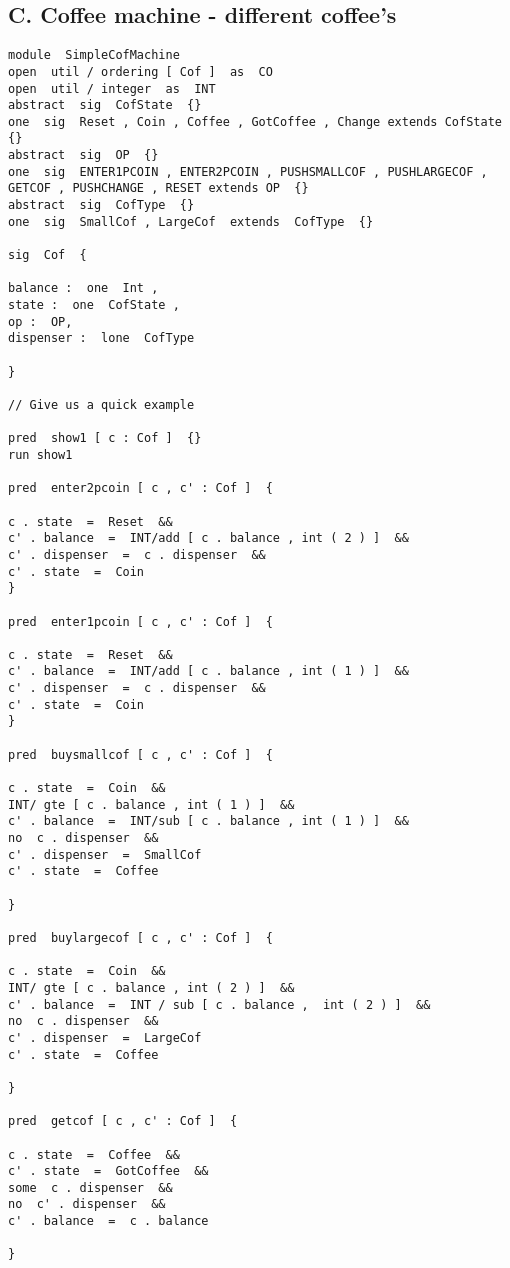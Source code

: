 \documentclass[a4paper,12pt]{extarticle}
\begin{document}
\subsection{C. Coffee machine - different coffee's}
\begin{verbatim}
module  SimpleCofMachine
open  util / ordering [ Cof ]  as  CO
open  util / integer  as  INT
abstract  sig  CofState  {}
one  sig  Reset , Coin , Coffee , GotCoffee , Change extends CofState  {}
abstract  sig  OP  {}
one  sig  ENTER1PCOIN , ENTER2PCOIN , PUSHSMALLCOF , PUSHLARGECOF ,
GETCOF , PUSHCHANGE , RESET extends OP  {}
abstract  sig  CofType  {}
one  sig  SmallCof , LargeCof  extends  CofType  {}

sig  Cof  {

balance :  one  Int ,
state :  one  CofState ,
op :  OP,
dispenser :  lone  CofType

}

// Give us a quick example

pred  show1 [ c : Cof ]  {}
run show1

pred  enter2pcoin [ c , c' : Cof ]  {

c . state  =  Reset  &&
c' . balance  =  INT/add [ c . balance , int ( 2 ) ]  &&
c' . dispenser  =  c . dispenser  &&
c' . state  =  Coin
}

pred  enter1pcoin [ c , c' : Cof ]  {

c . state  =  Reset  &&
c' . balance  =  INT/add [ c . balance , int ( 1 ) ]  &&
c' . dispenser  =  c . dispenser  &&
c' . state  =  Coin
}

pred  buysmallcof [ c , c' : Cof ]  {

c . state  =  Coin  &&
INT/ gte [ c . balance , int ( 1 ) ]  &&
c' . balance  =  INT/sub [ c . balance , int ( 1 ) ]  &&
no  c . dispenser  &&
c' . dispenser  =  SmallCof
c' . state  =  Coffee

}

pred  buylargecof [ c , c' : Cof ]  {

c . state  =  Coin  &&
INT/ gte [ c . balance , int ( 2 ) ]  &&
c' . balance  =  INT / sub [ c . balance ,  int ( 2 ) ]  &&
no  c . dispenser  &&
c' . dispenser  =  LargeCof
c' . state  =  Coffee

}

pred  getcof [ c , c' : Cof ]  {

c . state  =  Coffee  &&
c' . state  =  GotCoffee  &&
some  c . dispenser  &&
no  c' . dispenser  &&
c' . balance  =  c . balance

}


\end{verbatim}
\end{document}
